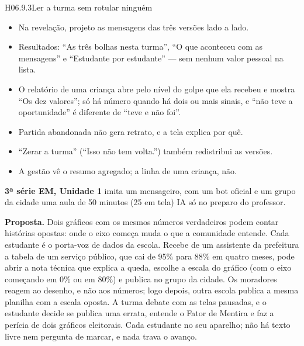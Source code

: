 \begin{historia}{H06.9.3}{Ler a turma sem rotular ninguém}{\pronto}
\aceite
\begin{itemize}
  \item Na revelação, projeto as mensagens das três versões lado a lado.
  \item Resultados: \enquote{As três bolhas nesta turma}, \enquote{O que
    aconteceu com as mensagens} e \enquote{Estudante por estudante} --- sem
    nenhum valor pessoal na lista.
  \item O relatório de uma criança abre pelo nível do golpe que ela recebeu e
    mostra \enquote{Os dez valores}; só há número quando há dois ou mais
    sinais, e \enquote{não teve a oportunidade} é diferente de \enquote{teve e
    não foi}.
  \item Partida abandonada não gera retrato, e a tela explica por quê.
  \item \enquote{Zerar a turma} (\enquote{Isso não tem volta.}) também
    redistribui as versões.
  \item A gestão vê o resumo agregado; a linha de uma criança, não.
\end{itemize}
\end{historia}


\textbf{3ª série EM, Unidade 1} \textperiodcentered{} imita um mensageiro, com
um bot oficial e um grupo da cidade \textperiodcentered{} uma aula de 50
minutos (25 em tela) \textperiodcentered{} IA só no preparo do professor.

\textbf{Proposta.} Dois gráficos com os mesmos números verdadeiros podem
contar histórias opostas: onde o eixo começa muda o que a comunidade entende.
Cada estudante é o porta-voz de dados da escola. Recebe de um assistente da
prefeitura a tabela de um serviço público, que cai de 95\% para 88\% em quatro
meses, pode abrir a nota técnica que explica a queda, escolhe a escala do
gráfico (com o eixo começando em 0\% ou em 80\%) e publica no grupo da cidade.
Os moradores reagem ao desenho, e não aos números; logo depois, outra escola
publica a mesma planilha com a escala oposta. A turma debate com as telas
pausadas, e o estudante decide se publica uma errata, entende o Fator de
Mentira e faz a perícia de dois gráficos eleitorais. Cada estudante no seu
aparelho; não há texto livre nem pergunta de marcar, e nada trava o avanço.

